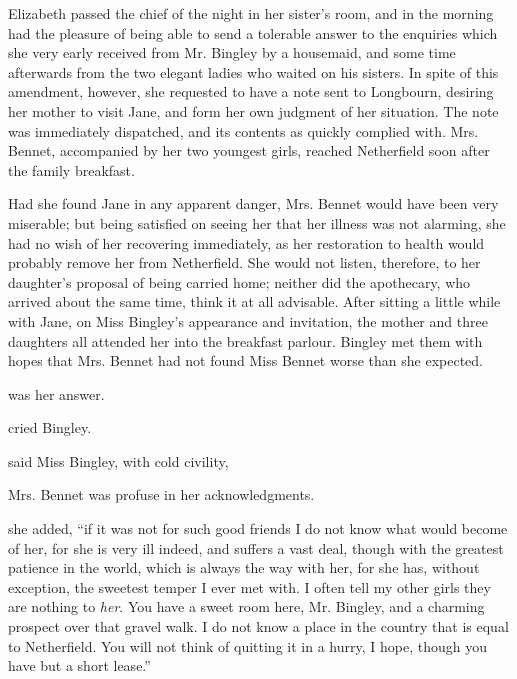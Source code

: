 Elizabeth passed the chief of the night in her sister's room, and in the morning had the pleasure of being able to send a tolerable answer to the enquiries which she very early received from Mr. Bingley by a housemaid, and some time afterwards from the two elegant ladies who waited on his sisters. In spite of this amendment, however, she requested to have a note sent to Longbourn, desiring her mother to visit Jane, and form her own judgment of her situation. The note was immediately dispatched, and its contents as quickly complied with. Mrs. Bennet, accompanied by her two youngest girls, reached Netherfield soon after the family breakfast.

Had she found Jane in any apparent danger, Mrs. Bennet would have been very miserable; but being satisfied on seeing her that her illness was not alarming, she had no wish of her recovering immediately, as her restoration to health would probably remove her from Netherfield. She would not listen, therefore, to her daughter's proposal of being carried home; neither did the apothecary, who arrived about the same time, think it at all advisable. After sitting a little while with Jane, on Miss Bingley's appearance and invitation, the mother and three daughters all attended her into the breakfast parlour. Bingley met them with hopes that Mrs. Bennet had not found Miss Bennet worse than she expected.

 was her answer. 

 cried Bingley. 

 said Miss Bingley, with cold civility, 

Mrs. Bennet was profuse in her acknowledgments.

 she added, “if it was not for such good friends I do not know what would become of her, for she is very ill indeed, and suffers a vast deal, though with the greatest patience in the world, which is always the way with her, for she has, without exception, the sweetest temper I ever met with. I often tell my other girls they are nothing to {\em her}. You have a sweet room here, Mr. Bingley, and a charming prospect over that gravel walk. I do not know a place in the country that is equal to Netherfield. You will not think of quitting it in a hurry, I hope, though you have but a short lease.”

